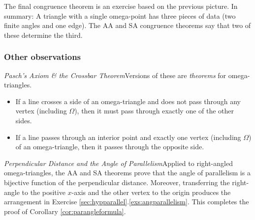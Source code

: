 The final congruence theorem is an exercise based on the previous picture.
In summary: A triangle with a single omega-point has three pieces of data (two finite angles and one edge). The AA and SA congruence theorems say that two of these determine the third.

\subsubsection*{Other observations}

\emph{Pasch's Axiom \& the Crossbar Theorem}\lstsp Versions of these are \emph{theorems} for omega-triangles.
\begin{itemize}\itemsep2pt
  \item If a line crosses a side of an omega-triangle and does not pass through any vertex (including $\Omega$), then it must pass through exactly one of the other sides.
  \item If a line passes through an interior point and exactly one vertex (including $\Omega$) of an omega-triangle, then it passes through the opposite side. %
\end{itemize}


\emph{Perpendicular Distance and the Angle of Parallelism}\lstsp Applied to right-angled omega-triangles, the AA and SA theorems prove that the angle of parallelism is a bijective function of the perpendicular distance. Moreover, transferring the right-angle to the positive $x$-axis and the other vertex to the origin produces the arrangement in Exercise \ref*{sec:hypparallel}.\ref{exs:angparallelism}. This completes the proof of Corollary \ref{cor:parangleformula}.


% 



